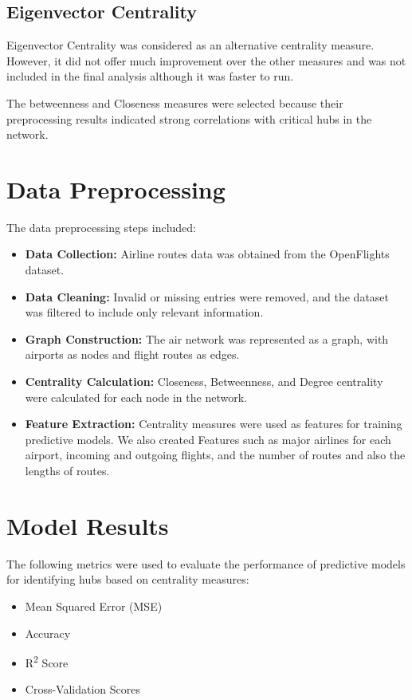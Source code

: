 \documentclass[12pt]{article}
\begin{document}
\subsection*{Eigenvector Centrality}
Eigenvector Centrality was considered as an alternative centrality measure. However, it did not offer much improvement over the other measures and was not included in the final analysis although it was faster to run.

The betweenness and Closeness measures were selected because their preprocessing results indicated strong correlations with critical hubs in the network.

\section*{Data Preprocessing}
The data preprocessing steps included:
\begin{itemize}
	\item \textbf{Data Collection:} Airline routes data was obtained from the OpenFlights dataset.
	\item \textbf{Data Cleaning:} Invalid or missing entries were removed, and the dataset was filtered to include only relevant information.
	\item \textbf{Graph Construction:} The air network was represented as a graph, with airports as nodes and flight routes as edges.
	\item \textbf{Centrality Calculation:} Closeness, Betweenness, and Degree centrality were calculated for each node in the network.
	\item \textbf{Feature Extraction:} Centrality measures were used as features for training predictive models. We also created Features such as major airlines for each airport, incoming and outgoing flights, and the number of routes and also the lengths of routes.
\end{itemize}

\section*{Model Results}
The following metrics were used to evaluate the performance of predictive models for identifying hubs based on centrality measures:
\begin{itemize}
	\item Mean Squared Error (MSE)
	\item Accuracy
	\item R\textsuperscript{2} Score
	\item Cross-Validation Scores
\end{itemize}
\end{document}
